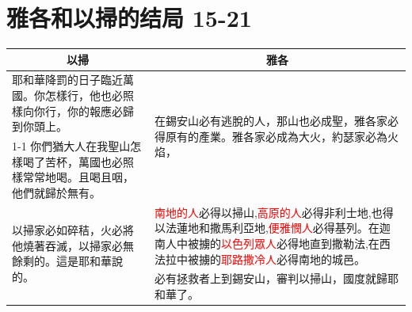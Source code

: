 \section{雅各和以掃的结局 15-21}
\begin{table}[H]
\centering
\begin{tabular}{p{7.25cm}|p{10.0cm}}\hline\hline
\multicolumn{1}{c|}{以掃}&\multicolumn{1}{c}{雅各}\\\hline
耶和華降罰的日子臨近萬國。你怎樣行，他也必照樣向你行，你的報應必歸到你頭上。
&\multirow{2}{10.cm}{在錫安山必有逃脫的人，那山也必成聖，雅各家必得原有的產業。雅各家必成為大火，約瑟家必為火焰，}\\\cline{1-1}
你們猶大人在我聖山怎樣喝了苦杯，萬國也必照樣常常地喝。且喝且咽，他們就歸於無有。&\\\hline\hline

\multirow{2}{7.25cm}{以掃家必如碎秸，火必將他燒著吞滅，以掃家必無餘剩的。這是耶和華說的。}
&\textcolor{red}{南地的人}必得以掃山,\textcolor{red}{高原的人}必得非利士地,也得以法蓮地和撒馬利亞地,\textcolor{red}{便雅憫人}必得基列。在迦南人中被擄的\textcolor{red}{以色列眾人}必得地直到撒勒法,在西法拉中被擄的\textcolor{red}{耶路撒冷人}必得南地的城邑。\\\cline{2-2}
&必有拯救者上到錫安山，審判以掃山，國度就歸耶和華了。\\\hline
\end{tabular}
\end{table}
 










